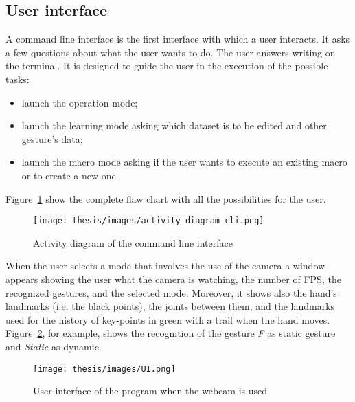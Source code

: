 \documentclass[../thesis.tex]{subfiles}
\begin{document}
\subsection{User interface}
A command line interface is the first interface with which a user interacts. It asks a few questions about what the user wants to do. The user answers writing on the terminal. It is designed to guide the user in the execution of the possible tasks:
\begin{itemize}
    \item launch the operation mode;
    \item launch the learning mode asking which dataset is to be edited and other gesture's data;
    \item launch the macro mode asking if the user wants to execute an existing macro or to create a new one.
\end{itemize}
Figure~\ref{fig:activity_diagram_cli} show the complete flaw chart with all the possibilities for the user.
\begin{figure}[H]
    \centering
    \texttt{[image: thesis/images/activity\_diagram\_cli.png]}
    \caption{Activity diagram of the command line interface}
    \label{fig:activity_diagram_cli}
\end{figure}

When the user selects a mode that involves the use of the camera a window appears showing the user what the camera is watching, the number of FPS, the recognized gestures, and the selected mode. Moreover, it shows also the hand's landmarks (i.e. the black points), the joints between them, and the landmarks used for the history of key-points in green with a trail when the hand moves. Figure~\ref{fig:example_ui}, for example, shows the recognition of the gesture \textit{F} as static gesture and \textit{Static} as dynamic.

\begin{figure}
    \centering
    \texttt{[image: thesis/images/UI.png]}
    \caption{User interface of the program when the webcam is used}
    \label{fig:example_ui}
\end{figure}
\end{document}
